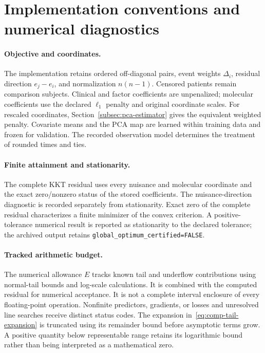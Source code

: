 \section{Implementation conventions and numerical diagnostics}
\label{app:implementation}
\paragraph{Objective and coordinates.}
The implementation retains ordered off-diagonal pairs, event weights $\Delta_i$, residual direction $e_j-e_i$, and normalization $n(n-1)$. Censored patients remain comparison subjects. Clinical and factor coefficients are unpenalized; molecular coefficients use the declared $\ell_1$ penalty and original coordinate scales. For rescaled coordinates, Section~\ref{subsec:pca-estimator} gives the equivalent weighted penalty. Covariate means and the PCA map are learned within training data and frozen for validation. The recorded observation model determines the treatment of rounded times and ties.

\paragraph{Finite attainment and stationarity.}
The complete KKT residual uses every nuisance and molecular coordinate and the exact zero/nonzero status of the stored coefficients. The nuisance-direction diagnostic is recorded separately from stationarity. Exact zero of the complete residual characterizes a finite minimizer of the convex criterion. A positive-tolerance numerical result is reported as stationarity to the declared tolerance; the archived output retains \texttt{global\_optimum\_certified=FALSE}.

\paragraph{Tracked arithmetic budget.}
The numerical allowance $E$ tracks known tail and underflow contributions using normal-tail bounds and log-scale calculations. It is combined with the computed residual for numerical acceptance. It is not a complete interval enclosure of every floating-point operation. Nonfinite predictors, gradients, or losses and unresolved line searches receive distinct status codes. The expansion in~\eqref{eq:comp-tail-expansion} is truncated using its remainder bound before asymptotic terms grow. A positive quantity below representable range retains its logarithmic bound rather than being interpreted as a mathematical zero.

